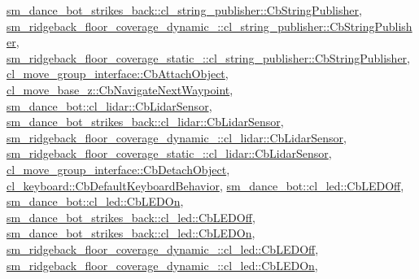 \hyperlink{classsm__dance__bot__strikes__back_1_1cl__string__publisher_1_1CbStringPublisher_a2c3963143fe180a5e5f939362857d2e0}{sm\+\_\+dance\+\_\+bot\+\_\+strikes\+\_\+back\+::cl\+\_\+string\+\_\+publisher\+::\+Cb\+String\+Publisher}, \hyperlink{classsm__ridgeback__floor__coverage__dynamic__1_1_1cl__string__publisher_1_1CbStringPublisher_a50bac09cd616c4ba6be03fadf77612cf}{sm\+\_\+ridgeback\+\_\+floor\+\_\+coverage\+\_\+dynamic\+\_\+::cl\+\_\+string\+\_\+publisher\+::\+Cb\+String\+Publisher}, \hyperlink{classsm__ridgeback__floor__coverage__static__1_1_1cl__string__publisher_1_1CbStringPublisher_a35027bdfa78cbe6becf627f3af3fa91b}{sm\+\_\+ridgeback\+\_\+floor\+\_\+coverage\+\_\+static\+\_\+::cl\+\_\+string\+\_\+publisher\+::\+Cb\+String\+Publisher}, \hyperlink{classcl__move__group__interface_1_1CbAttachObject_a05cd996ea25ee1b2ae74541a5ec56e98}{cl\+\_\+move\+\_\+group\+\_\+interface\+::\+Cb\+Attach\+Object}, \hyperlink{classcl__move__base__z_1_1CbNavigateNextWaypoint_a04913ef24344363669c1916b5df28493}{cl\+\_\+move\+\_\+base\+\_\+z\+::\+Cb\+Navigate\+Next\+Waypoint}, \hyperlink{structsm__dance__bot_1_1cl__lidar_1_1CbLidarSensor_aad3468a6ae78999c9fd01bdb81b42a49}{sm\+\_\+dance\+\_\+bot\+::cl\+\_\+lidar\+::\+Cb\+Lidar\+Sensor}, \hyperlink{structsm__dance__bot__strikes__back_1_1cl__lidar_1_1CbLidarSensor_a82d0250dcf2d4e9b12ccd528a5d87002}{sm\+\_\+dance\+\_\+bot\+\_\+strikes\+\_\+back\+::cl\+\_\+lidar\+::\+Cb\+Lidar\+Sensor}, \hyperlink{structsm__ridgeback__floor__coverage__dynamic__1_1_1cl__lidar_1_1CbLidarSensor_ac5fae5ba7d97eb1688bc6049d6cebc71}{sm\+\_\+ridgeback\+\_\+floor\+\_\+coverage\+\_\+dynamic\+\_\+::cl\+\_\+lidar\+::\+Cb\+Lidar\+Sensor}, \hyperlink{structsm__ridgeback__floor__coverage__static__1_1_1cl__lidar_1_1CbLidarSensor_afa8370b0a425f6bf03622391262274d5}{sm\+\_\+ridgeback\+\_\+floor\+\_\+coverage\+\_\+static\+\_\+::cl\+\_\+lidar\+::\+Cb\+Lidar\+Sensor}, \hyperlink{classcl__move__group__interface_1_1CbDetachObject_a04af88f1d9b64c43eb2620ac5bd62c35}{cl\+\_\+move\+\_\+group\+\_\+interface\+::\+Cb\+Detach\+Object}, \hyperlink{classcl__keyboard_1_1CbDefaultKeyboardBehavior_a06e49d8c78aeffecf74c27b05f529a3a}{cl\+\_\+keyboard\+::\+Cb\+Default\+Keyboard\+Behavior}, \hyperlink{classsm__dance__bot_1_1cl__led_1_1CbLEDOff_a3c0ed097db52baae1928a19936f09a83}{sm\+\_\+dance\+\_\+bot\+::cl\+\_\+led\+::\+Cb\+L\+E\+D\+Off}, \hyperlink{classsm__dance__bot_1_1cl__led_1_1CbLEDOn_a3b7de8585d728becefb8c2c5cc3b6d95}{sm\+\_\+dance\+\_\+bot\+::cl\+\_\+led\+::\+Cb\+L\+E\+D\+On}, \hyperlink{classsm__dance__bot__strikes__back_1_1cl__led_1_1CbLEDOff_acde07c4940b5f210ddaa8aaac60b03c2}{sm\+\_\+dance\+\_\+bot\+\_\+strikes\+\_\+back\+::cl\+\_\+led\+::\+Cb\+L\+E\+D\+Off}, \hyperlink{classsm__dance__bot__strikes__back_1_1cl__led_1_1CbLEDOn_a49de8ffe1304efb84e10a76c4d309d89}{sm\+\_\+dance\+\_\+bot\+\_\+strikes\+\_\+back\+::cl\+\_\+led\+::\+Cb\+L\+E\+D\+On}, \hyperlink{classsm__ridgeback__floor__coverage__dynamic__1_1_1cl__led_1_1CbLEDOff_ae61f42d9f601072f3695c7e6d1b08f7b}{sm\+\_\+ridgeback\+\_\+floor\+\_\+coverage\+\_\+dynamic\+\_\+::cl\+\_\+led\+::\+Cb\+L\+E\+D\+Off}, \hyperlink{classsm__ridgeback__floor__coverage__dynamic__1_1_1cl__led_1_1CbLEDOn_ac9c08e85e05de12670ec76d6860ad85d}{sm\+\_\+ridgeback\+\_\+floor\+\_\+coverage\+\_\+dynamic\+\_\+::cl\+\_\+led\+::\+Cb\+L\+E\+D\+On}, 
